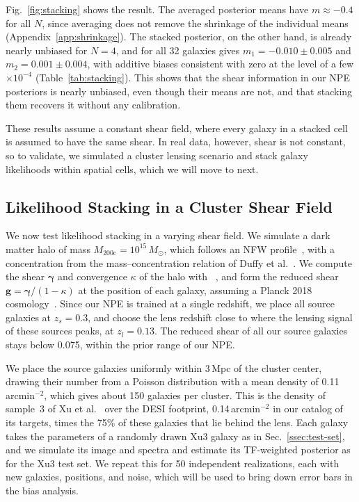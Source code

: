 Fig.~\ref{fig:stacking} shows the result. The averaged posterior means have $m \approx -0.4$ for all $N$, since averaging does not remove the shrinkage of the individual means (Appendix~\ref{app:shrinkage}). The stacked posterior, on the other hand, is already nearly unbiased for $N = 4$, and for all 32 galaxies gives $m_1 = -0.010 \pm 0.005$ and $m_2 = 0.001 \pm 0.004$, with additive biases consistent with zero at the level of a few $\times 10^{-4}$ (Table~\ref{tab:stacking}). This shows that the shear information in our NPE posteriors is nearly unbiased, even though their means are not, and that stacking them recovers it without any calibration.

These results assume a constant shear field, where every galaxy in a stacked cell is assumed to have the same shear. In real data, however, shear is not constant, so to validate, we simulated a cluster lensing scenario and stack galaxy likelihoods within spatial cells, which we will move to next.

\subsection{Likelihood Stacking in a Cluster Shear Field}
\label{ssec:cluster}

We now test likelihood stacking in a varying shear field. We simulate a dark matter halo of mass $M_\mathrm{200c} = 10^{15}\,M_\odot$, which follows an NFW profile~\citep{NFW97}, with a concentration from the mass--concentration relation of Duffy et al.~\citep{Duffy08}. We compute the shear $\boldsymbol{\gamma}$ and convergence $\kappa$ of the halo with \galsim~\citep{galsim}, and form the reduced shear $\mathbf{g} = \boldsymbol{\gamma}/(1-\kappa)$ at the position of each galaxy, assuming a Planck 2018 cosmology~\citep{Planck18}. Since our NPE is trained at a single redshift, we place all source galaxies at $z_s = 0.3$, and choose the lens redshift close to where the lensing signal of these sources peaks, at $z_l = 0.13$. The reduced shear of all our source galaxies stays below 0.075, within the prior range of our NPE.

We place the source galaxies uniformly within 3\,Mpc of the cluster center, drawing their number from a Poisson distribution with a mean density of 0.11\,arcmin$^{-2}$, which gives about 150 galaxies per cluster. This is the density of sample~3 of Xu et al.~\citep{KLDESI} over the DESI footprint, 0.14\,arcmin$^{-2}$ in our catalog of its targets, times the 75\% of these galaxies that lie behind the lens. Each galaxy takes the parameters of a randomly drawn Xu3 galaxy as in Sec.~\ref{ssec:test-set}, and we simulate its image and spectra and estimate its TF-weighted posterior as for the Xu3 test set. We repeat this for 50 independent realizations, each with new galaxies, positions, and noise, which will be used to bring down error bars in the bias analysis.


